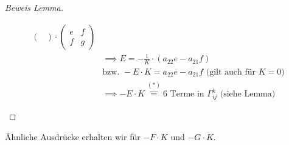 \documentclass[../main.tex]{subfiles}
\begin{document}
\begin{proof}[Beweis Lemma]
\begin{recall}
\begin{align*}
\begin{pmatrix}
            \end{pmatrix}\cdot \begin{pmatrix}
                e&f\\f&g
            \end{pmatrix}\\
            &\implies E = -\frac{1}{K}\cdot (a_{22}e-a_{21}f)\\
            &\text{bzw. } -E\cdot K = a_{22}e-a_{21}f \text{ (gilt auch für } K=0 \text{)}\\
            &\implies -E\cdot K \overbrace{=}^{(*)} 6 \text{ Terme in } \Gamma_{ij}^{k} \text{ (siehe Lemma)}
        \end{align*}
    \end{recall}
\end{proof}
\begin{remark}
    Ähnliche Ausdrücke erhalten wir für $-F\cdot K$ und $-G\cdot K$.
\end{remark}
\end{document}
